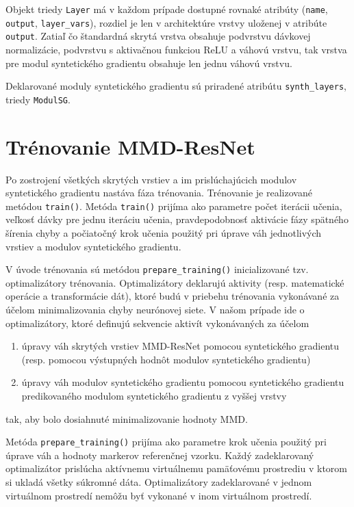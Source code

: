 Objekt triedy \texttt{Layer} má v každom prípade dostupné rovnaké atribúty (\texttt{name}, \texttt{output}, \texttt{layer_vars}), rozdiel je len v architektúre vrstvy uloženej v atribúte \texttt{output}. Zatiaľ čo štandardná skrytá vrstva obsahuje podvrstvu dávkovej normalizácie, podvrstvu s aktivačnou funkciou ReLU a váhovú vrstvu, tak vrstva pre modul syntetického gradientu obsahuje len jednu váhovú vrstvu.

Deklarované moduly syntetického gradientu sú priradené atribútu \texttt{synth_layers}, triedy \texttt{ModulSG}.

\section{Trénovanie MMD-ResNet}
\label{implementacia_trenovania_MMD_ResNet}

Po zostrojení všetkých skrytých vrstiev a im prislúchajúcich modulov syntetického gradientu nastáva fáza trénovania. Trénovanie je realizované metódou \texttt{train()}. Metóda \texttt{train()} prijíma ako parametre počet iterácii učenia, veľkosť dávky pre jednu iteráciu učenia, pravdepodobnosť aktivácie fázy spätného šírenia chyby a počiatočný krok učenia použitý pri úprave váh jednotlivých vrstiev a modulov syntetického gradientu.

V úvode trénovania sú metódou \texttt{prepare_training()} inicializované tzv. optimalizátory trénovania. Optimalizátory deklarujú aktivity (resp. matematické operácie a transformácie dát), ktoré budú v priebehu trénovania vykonávané za účelom minimalizovania chyby neurónovej siete. V našom prípade ide o optimalizátory, ktoré definujú sekvencie aktivít vykonávaných za účelom 
\begin{enumerate}
    \item úpravy váh skrytých vrstiev MMD-ResNet pomocou syntetického gradientu (resp. pomocou výstupných hodnôt modulov syntetického gradientu)
    \item úpravy váh modulov syntetického gradientu pomocou syntetického gradientu predikovaného modulom syntetického gradientu z vyššej vrstvy
\end{enumerate}
tak, aby bolo dosiahnuté minimalizovanie hodnoty MMD.

Metóda \texttt{prepare_training()} prijíma ako parametre krok učenia použitý pri úprave váh a hodnoty markerov referenčnej vzorku. Každý zadeklarovaný optimalizátor prislúcha aktívnemu virtuálnemu pamäťovému prostrediu v ktorom si ukladá všetky súkromné dáta. Optimalizátory zadeklarované v jednom virtuálnom prostredí nemôžu byť vykonané v inom virtuálnom prostredí.

